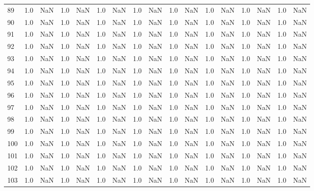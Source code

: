 \begin{tabular}{lrrrrrrrrrrrrrrrr}
     89 &  1.0 & NaN &   1.0 &   NaN &   1.0 &   NaN &   1.0 &   NaN &   1.0 &   NaN &   1.0 &   NaN &   1.0 &   NaN &   1.0 &   NaN \\
     90 &  1.0 & NaN &   1.0 &   NaN &   1.0 &   NaN &   1.0 &   NaN &   1.0 &   NaN &   1.0 &   NaN &   1.0 &   NaN &   1.0 &   NaN \\
     91 &  1.0 & NaN &   1.0 &   NaN &   1.0 &   NaN &   1.0 &   NaN &   1.0 &   NaN &   1.0 &   NaN &   1.0 &   NaN &   1.0 &   NaN \\
     92 &  1.0 & NaN &   1.0 &   NaN &   1.0 &   NaN &   1.0 &   NaN &   1.0 &   NaN &   1.0 &   NaN &   1.0 &   NaN &   1.0 &   NaN \\
     93 &  1.0 & NaN &   1.0 &   NaN &   1.0 &   NaN &   1.0 &   NaN &   1.0 &   NaN &   1.0 &   NaN &   1.0 &   NaN &   1.0 &   NaN \\
     94 &  1.0 & NaN &   1.0 &   NaN &   1.0 &   NaN &   1.0 &   NaN &   1.0 &   NaN &   1.0 &   NaN &   1.0 &   NaN &   1.0 &   NaN \\
     95 &  1.0 & NaN &   1.0 &   NaN &   1.0 &   NaN &   1.0 &   NaN &   1.0 &   NaN &   1.0 &   NaN &   1.0 &   NaN &   1.0 &   NaN \\
     96 &  1.0 & NaN &   1.0 &   NaN &   1.0 &   NaN &   1.0 &   NaN &   1.0 &   NaN &   1.0 &   NaN &   1.0 &   NaN &   1.0 &   NaN \\
     97 &  1.0 & NaN &   1.0 &   NaN &   1.0 &   NaN &   1.0 &   NaN &   1.0 &   NaN &   1.0 &   NaN &   1.0 &   NaN &   1.0 &   NaN \\
     98 &  1.0 & NaN &   1.0 &   NaN &   1.0 &   NaN &   1.0 &   NaN &   1.0 &   NaN &   1.0 &   NaN &   1.0 &   NaN &   1.0 &   NaN \\
     99 &  1.0 & NaN &   1.0 &   NaN &   1.0 &   NaN &   1.0 &   NaN &   1.0 &   NaN &   1.0 &   NaN &   1.0 &   NaN &   1.0 &   NaN \\
    100 &  1.0 & NaN &   1.0 &   NaN &   1.0 &   NaN &   1.0 &   NaN &   1.0 &   NaN &   1.0 &   NaN &   1.0 &   NaN &   1.0 &   NaN \\
    101 &  1.0 & NaN &   1.0 &   NaN &   1.0 &   NaN &   1.0 &   NaN &   1.0 &   NaN &   1.0 &   NaN &   1.0 &   NaN &   1.0 &   NaN \\
    102 &  1.0 & NaN &   1.0 &   NaN &   1.0 &   NaN &   1.0 &   NaN &   1.0 &   NaN &   1.0 &   NaN &   1.0 &   NaN &   1.0 &   NaN \\
    103 &  1.0 & NaN &   1.0 &   NaN &   1.0 &   NaN &   1.0 &   NaN &   1.0 &   NaN &   1.0 &   NaN &   1.0 &   NaN &   1.0 &   NaN \\

\end{tabular}
